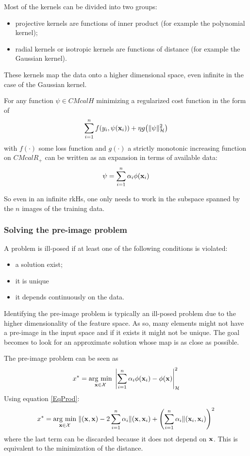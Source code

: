 Most of the kernels can be divided into two groups:
\begin{itemize}
\item projective kernels are functions of inner product (for example the polynomial kernel);
\item radial kernels or isotropic kernels are functions of distance (for example the Gaussian kernel).
\end{itemize}
These kernels map the data onto a higher dimensional space, even infinite in the case of the Gaussian kernel.
\begin{theorem}{}
For any function $\psi \in CMcal{H}$ minimizing a regularized cost function in the form of
\begin{equation}
\sum_{i=1}^n f\br{y_i, \psi(\x_i)} + \eta g\br{\|\psi\|^2_\CMcal{H}}
\end{equation}
with $f(\cdot)$ some loss function and $g(\cdot)$ a strictly monotonic increasing function on $CMcal{R}_{+}$ can be written as an expansion in terms of available data:
\begin{equation}
\psi = \sum_{i=1}^n \alpha_i \phi(\mathbf{x}_i)
\end{equation} 
\end{theorem}
So even in an infinite rkHs, one only needs to work in the subspace spanned by the $n$ images of the training data.

\subsubsection{Solving the pre-image problem}
A problem is ill-posed if at least one of the following conditions is violated:
\begin{itemize}
\item a solution exist;
\item it is unique 
\item it depends continuously on the data.
\end{itemize}
Identifying the pre-image problem is typically an ill-posed problem due to the higher dimensionality of the feature space. As so, many elements might not have a pre-image in the input space and if it exists it might not be unique. The goal becomes to look for an approximate solution whose map is as close as possible.

The pre-image problem can be seen as 
\begin{equation}
x^* = \argmin{\x \in \CMcal{X}} \left| \sum_{i=1}^n \alpha_i \phi(\x_i) - \phi(\x)\right|^2_{\CMcal{H}}
\end{equation}
Using equation \autoref{EqProd}:
\begin{equation}
\label{MinFunct}
x^* = \argmin{\x \in \CMcal{X}} \CMcal{k}(\x,\x) -2 \sum_{i=1}^n \alpha_i \CMcal{k}(\x,\x_i) + \br{\sum_{i=1}^n \alpha_i \CMcal{k}(\x_i,\x_i)}^2
\end{equation}
where the last term can be discarded because it does not depend on $\mathbf{x}$. This is equivalent to the minimization of the distance.

